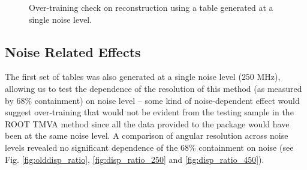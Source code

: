 \documentclass[main.tex]{subfiles}
\begin{document}
\begin{figure}[H]
{    \label{fig:dispErr_test_overtraining}
  }
  \caption[Over-training test]{Over-training check on reconstruction using a \disp table generated at a single noise level.}
  \label{fig:overtraining}
\end{figure}

\subsection{Noise Related Effects}
The first set of \disp tables was also generated at a single noise level ($250$ MHz), allowing us to test the dependence of the resolution of this method (as measured by 68\% containment) on noise level -- some kind of noise-dependent effect would suggest over-training that would not be evident from the testing sample in the ROOT TMVA method since all the data provided to the package would have been at the same noise level. A comparison of angular resolution across noise levels revealed no significant dependence of the 68\% containment on noise (see Fig. \ref{fig:olddisp_ratio}, \ref{fig:disp_ratio_250} and \ref{fig:disp_ratio_450}).
\end{document}
